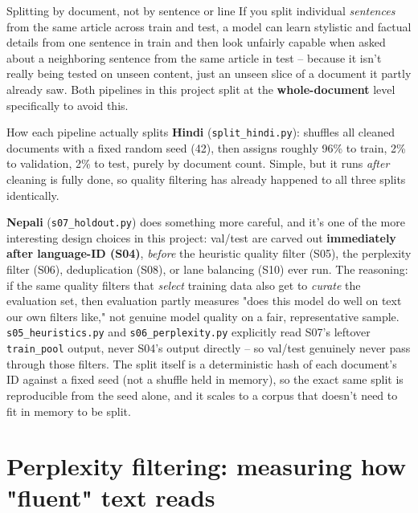 \documentclass[11pt]{report}
\begin{document}
\begin{example}{Splitting by document, not by sentence or line}
If you split individual \textit{sentences} from the same article across
train and test, a model can learn stylistic and factual details from one
sentence in train and then look unfairly capable when asked about a
neighboring sentence from the same article in test -- because it isn't
really being tested on unseen content, just an unseen slice of a document
it partly already saw. Both pipelines in this project split at the
\textbf{whole-document} level specifically to avoid this.
\end{example}

\begin{implementation}{How each pipeline actually splits}
\textbf{Hindi} (\texttt{split\_hindi.py}): shuffles all cleaned documents
with a fixed random seed (42), then assigns roughly 96\% to train, 2\% to
validation, 2\% to test, purely by document count. Simple, but it runs
\textit{after} cleaning is fully done, so quality filtering has already
happened to all three splits identically.

\textbf{Nepali} (\texttt{s07\_holdout.py}) does something more careful,
and it's one of the more interesting design choices in this project:
val/test are carved out \textbf{immediately after language-ID
(S04)}, \textit{before} the heuristic quality filter (S05), the
perplexity filter (S06), deduplication (S08), or lane balancing (S10)
ever run. The reasoning: if the same quality filters that \textit{select}
training data also get to \textit{curate} the evaluation set, then
evaluation partly measures "does this model do well on text our own
filters like," not genuine model quality on a fair, representative
sample. \texttt{s05\_heuristics.py} and \texttt{s06\_perplexity.py}
explicitly read S07's leftover \texttt{train\_pool} output, never S04's
output directly -- so val/test genuinely never pass through those
filters. The split itself is a deterministic hash of each document's ID
against a fixed seed (not a shuffle held in memory), so the exact same
split is reproducible from the seed alone, and it scales to a corpus that
doesn't need to fit in memory to be split.
\end{implementation}

\section{Perplexity filtering: measuring how "fluent" text reads}
\end{document}
